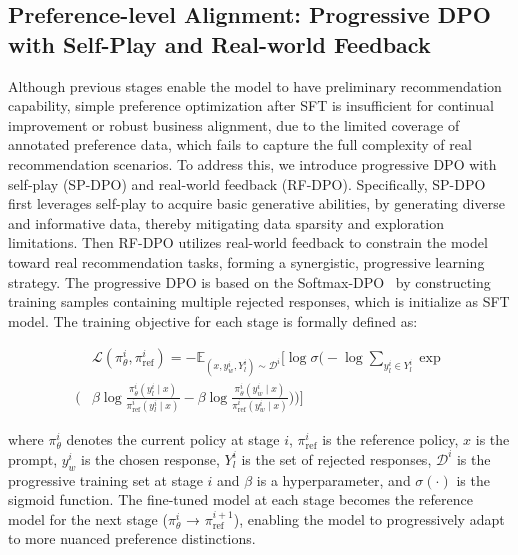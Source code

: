 \documentclass[letterpaper]{article} %
\begin{document}
\subsection{Preference-level Alignment: Progressive DPO with Self-Play and Real-world Feedback}
Although previous stages enable the model to have preliminary recommendation capability, simple preference optimization after SFT is insufficient for continual improvement or robust business alignment, due to the limited coverage of annotated preference data, which fails to capture the full complexity of real recommendation scenarios.
%
To address this, we introduce progressive DPO with self-play (SP-DPO) and real-world feedback (RF-DPO). Specifically, SP-DPO first leverages self-play to acquire basic generative abilities,  by generating diverse and informative data, thereby mitigating data sparsity and exploration limitations. Then RF-DPO utilizes real-world feedback to constrain the model toward real recommendation tasks, forming a synergistic, progressive learning strategy.
%
The progressive DPO is based on the Softmax-DPO~\cite{softmax-dpo} by constructing training samples containing multiple rejected responses, which is initialize as SFT model. The training objective for each stage is formally defined as:
%

%
\begin{small}
\begin{align}
&\mathcal{L}(\pi_{\theta}^i, \pi_{\mathrm{ref}}^i) 
 = -\mathbb{E}_{\left(x, y_w^i, Y_l^i\right) \sim \mathcal{D}^i} \Bigg[ 
 \log \sigma \Bigg( 
        -\log \sum_{y_l^i \in Y_l^i} \exp \\
        \Bigg( 
          &  \beta \log \frac{\pi_\theta^i\left(y_l^i \mid x\right)}{\pi_{\mathrm{ref}}^i\left(y_l^i \mid x\right)} 
            - \beta \log \frac{\pi_\theta^i\left(y_w^i \mid x\right)}{\pi_{\mathrm{ref}}^i\left(y_w^i \mid x\right)} 
        \Bigg) 
    \Bigg)
    \Bigg]\nonumber 
\end{align}
\label{eqn:3} 
\end{small}
%

%
where $\pi_\theta^i$ denotes the current policy at stage $i$, $\pi_{\mathrm{ref}}^i$ is the reference policy, $x$ is the prompt, $y_w^i$ is the chosen response, $Y_l^i$ is the set of rejected responses, $\mathcal{D}^i$ is the progressive training set at stage $i$ and  $\beta$ is a hyperparameter, and $\sigma(\cdot)$ is the sigmoid function. The fine-tuned model at each stage becomes the reference model for the next stage ($\pi_{\theta}^i$ → $\pi_{\mathrm{ref}}^{i+1}$), enabling the model to progressively adapt to more nuanced preference distinctions.
%
\end{document}
